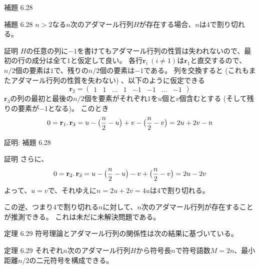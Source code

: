 \documentclass[dvipdfmx,10pt,jsarticle]{beamer}
\begin{document}
  \begin{frame}{補題 6.28}
    \begin{block}{補題 6.28}
      $n > 2$なる$n$次のアダマール行列$H$が存在する場合、$n$は$4$で割り切れる。
    \end{block}

      \begin{block}{証明}
        $H$の任意の列に$-1$を書けてもアダマール行列の性質は失われないので、最初の行の成分は全て$1$と仮定して良い。
        各行$\mathbf{r}_i \ (i \neq 1)$は$\mathbf{r}_1$と直交するので、$n/2$個の要素は$1$で、残りの$n/2$個の要素は$-1$である。
        列を交換すると (これもまたアダマール行列の性質を失わない) 、以下のように仮定できる
        \[ \mathbf{r}_2 = \begin{pmatrix} 1 & 1 & \ldots & 1 & -1 & -1 & \ldots & -1 \end{pmatrix} \]
        $\mathbf{r}_3$の列の最初と最後の$n/2$個を要素がそれぞれ$1$を$u$個と$v$個含むとする (そして残りの要素が$-1$となる)。 このとき
        \[0 = \mathbf{r}_1 \ldotp \mathbf{r}_3 = u - \big( \frac n2 - u \big) + v - \big( \frac n2 - v \big) = 2u + 2v - n\]
      \end{block}
  \end{frame}
  \begin{frame}{証明: 補題 6.28}
      \begin{block}{証明}
        さらに、
        \[ 0 = \mathbf{r}_2 \ldotp \mathbf{r}_3 = u - \big( \frac n2 - u \big) - v + \big( \frac n2 - v \big) = 2u - 2v \]
        よって、$u = v$で、それゆえに$n = 2u + 2v = 4u$は$4$で割り切れる。
      \end{block}
        
      \vspace{1cm}
      この逆、つまり$4$で割り切れる$n$に対して、$n$次のアダマール行列が存在することが推測できる。
      これは未だに未解決問題である。

  \end{frame}

  \begin{frame}{定理 6.29}
    符号理論とアダマール行列の関係性は次の結果に基づいている。
    \begin{block}{定理 6.29}
      それぞれ$n$次のアダマール行列$H$から符号長$n$で符号語数$M = 2n$、最小距離$n/2$の二元符号を構成できる。
    \end{block}

  \end{frame}
\end{document}
